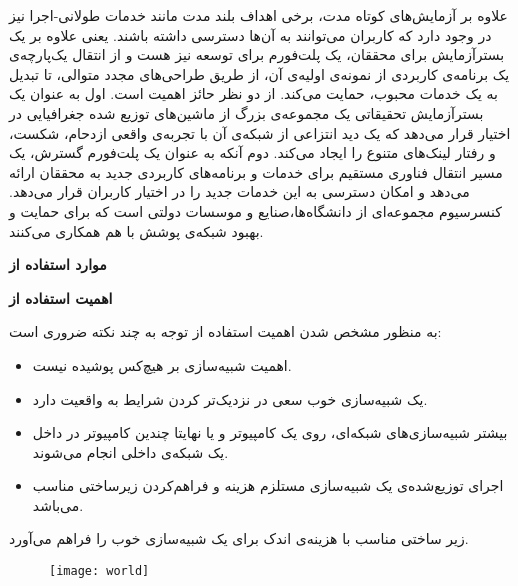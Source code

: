 \documentclass[11pt]{article}
\begin{document}
علاوه بر آزمایش‌های کوتاه مدت، برخی اهداف بلند مدت مانند خدمات طولانی-اجرا نیز در  وجود دارد که کاربران می‌توانند به آن‌ها دسترسی داشته باشند. یعنی علاوه بر یک بسترآزمایش برای محققان،‌ یک پلت‌فورم برای توسعه نیز هست و از انتقال یک‌پارچه‌ی یک برنامه‌ی کاربردی از نمونه‌ی اولیه‌ی آن، از طریق طراحی‌های مجدد متوالی،‌ تا تبدیل به یک خدمات محبوب، حمایت می‌کند.
از دو نظر حائز اهمیت است. اول به عنوان یک بسترآزمایش  تحقیقاتی یک مجموعه‌ی بزرگ از ماشین‌های توزیع شده جغرافیایی در اختیار قرار می‌دهد که یک دید انتزاعی از شبکه‌ی آن با تجربه‌ی واقعی ازدحام، شکست، و رفتار لینک‌های متنوع را ایجاد می‌کند. دوم آنکه به عنوان یک پلت‌فورم گسترش،‌ یک مسیر انتقال فناوری مستقیم برای خدمات و برنامه‌های کاربردی جدید به محققان ارائه می‌دهد و امکان دسترسی به این خدمات جدید را در اختیار کاربران قرار می‌دهد.
کنسرسیوم  مجموعه‌ای از دانشگاه‌ها،‌صنایع و موسسات دولتی است که برای حمایت و بهبود شبکه‌ی پوشش  با هم همکاری می‌کنند.

\bigskip

\noindent\textbf{موارد استفاده از }




\bigskip

\noindent\textbf{اهمیت استفاده از }

به منظور مشخص شدن اهمیت استفاده از  توجه به چند نکته ضروری است:
\begin{itemize}
	\item
	اهمیت شبیه‌سازی بر هیچ‌کس پوشیده نیست.
	\item
	یک شبیه‌سازی خوب سعی در نزدیک‌تر کردن شرایط به واقعیت دارد.
	\item
	بیشتر شبیه‌سازی‌های شبکه‌ای، روی یک کامپیوتر و یا نهایتا چندین کامپیوتر در داخل یک شبکه‌ی داخلی انجام می‌شوند.
	\item
	اجرای توزیع‌شده‌ی یک شبیه‌سازی مستلزم هزینه‌ و فراهم‌کردن زیرساختی مناسب می‌باشد.
\end{itemize}

 زیر ساختی مناسب با هزینه‌ی اندک برای یک شبیه‌سازی خوب را فراهم می‌آورد.

\begin{figure}[h]
	\centering
	\texttt{[image: world]}
\end{figure}

\end{document}
